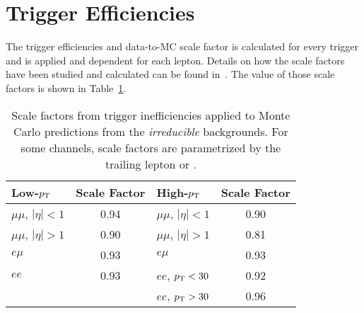 \section{Trigger Efficiencies}
\label {sec:eff_trig}
The trigger efficiencies and data-to-MC scale factor is calculated for
every trigger and is applied \pt and \aeta dependent for each lepton.
Details on how the scale factors have been studied and calculated can be
found in~\cite{an_ufl2013}. The value of those scale factors is shown in
Table~\ref{tab:eff_trig}.
\begin{table}[!hbt]
\begin{center}
\caption[Scale factors from trigger inefficiencies applied to Monte Carlo predictions from the rare backgrounds]
{\label{tab:eff_trig}
Scale factors from trigger inefficiencies applied to Monte Carlo predictions
from the \emph{irreducible} backgrounds. For some channels, scale factors are
parametrized by the trailing lepton \pt or \aeta.
}
\begin{tabular}{|l|c|l|c|} \hline\hline
Low-$p_{\mathrm{T}}$            & Scale Factor & High-$p_{\mathrm{T}}$           & Scale Factor  \\ \hline \hline
$\mu\mu$, $|\eta|<1$ & 0.94         & $\mu\mu$, $|\eta|<1$ & 0.90          \\ \hline
$\mu\mu$, $|\eta|>1$ & 0.90         & $\mu\mu$, $|\eta|>1$ & 0.81          \\ \hline
$e\mu$               & 0.93         & $e\mu$               & 0.93          \\ \hline
$ee$                 & 0.93         & $ee$, $p_{\mathrm{T}}<30$       & 0.92          \\ \hline
                     &              & $ee$, $p_{\mathrm{T}}>30$       & 0.96          \\ \hline\hline
\end{tabular}
\end{center}
\end{table}

